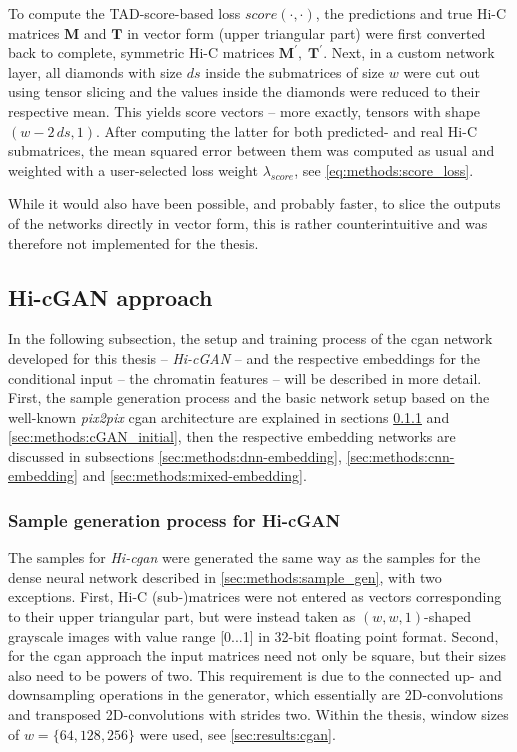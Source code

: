 To compute the TAD-score-based loss $\mathit{score}(\cdot,\cdot)$, the predictions and true Hi-C matrices $\mathbf{M}$ and $\mathbf{T}$ in vector form (upper triangular part)
were first converted back to complete, symmetric Hi-C matrices $\mathbf{M}^\prime,\; \mathbf{T}^\prime$. 
Next, in a custom network layer, all diamonds with size $ds$ inside the submatrices of size $w$ were cut out using tensor slicing and the values inside the diamonds were reduced to their respective mean.
This yields score vectors -- more exactly, tensors with shape $(w - 2\,ds, 1)$.
After computing the latter for both predicted- and real Hi-C submatrices, the mean squared error between them was computed as usual and weighted with 
a user-selected loss weight $\lambda_\mathit{score}$, see \cref{eq:methods:score_loss}.

While it would also have been possible, and probably faster, to slice the outputs of the networks directly in vector form, 
this is rather counterintuitive and was therefore not implemented for the thesis. 
\clearpage 

\subsection{Hi-cGAN approach} \label{sec:methods:hicgan}
In the following subsection, the setup and training process of the \acrshort{cgan} network developed for this thesis -- \emph{Hi-cGAN} -- and the respective
embeddings for the conditional input -- the chromatin features -- will be described in more detail.
First, the sample generation process and the basic network setup based on the well-known \emph{pix2pix} \acrshort{cgan} architecture \cite{Isola2017} 
are explained in sections \ref{sec:methods:sample_gen_cgan} and \ref{sec:methods:cGAN_initial}, 
then the respective embedding networks are discussed in subsections \ref{sec:methods:dnn-embedding},
\ref{sec:methods:cnn-embedding} and \ref{sec:methods:mixed-embedding}.

\subsubsection{Sample generation process for Hi-cGAN} \label{sec:methods:sample_gen_cgan}
The samples for \emph{Hi-\acrshort{cgan}} were generated the same way as the samples for the dense neural network described 
in \cref{sec:methods:sample_gen}, with two exceptions.
First, Hi-C (sub-)matrices were not entered as vectors corresponding to their upper triangular part, 
but were instead taken as $(w, w, 1)$-shaped grayscale images with value range [0...1] in 32-bit floating point format.
Second, for the \acrshort{cgan} approach the input matrices need not only be square,
but their sizes also need to be powers of two. 
This requirement is due to the connected up- and downsampling operations in the generator, 
which essentially are 2D-convolutions and transposed 2D-convolutions with strides two.
Within the thesis, window sizes of $w=\{64,128,256\}$ were used, see \cref{sec:results:cgan}.

